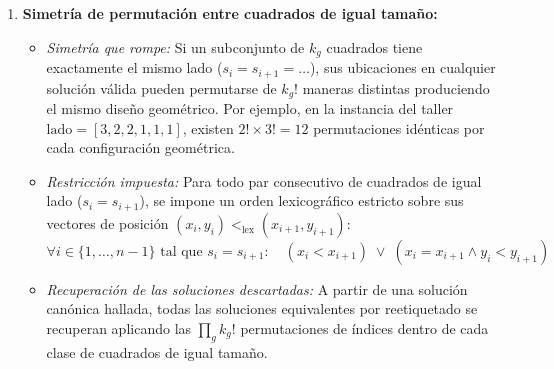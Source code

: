 \begin{enumerate}
    \item \textbf{Simetría de permutación entre cuadrados de igual tamaño:}
    \begin{itemize}
        \item \textit{Simetría que rompe:} Si un subconjunto de $k_g$ cuadrados tiene exactamente el mismo lado ($s_i = s_{i+1} = \dots$), sus ubicaciones en cualquier solución válida pueden permutarse de $k_g!$ maneras distintas produciendo el mismo diseño geométrico. Por ejemplo, en la instancia del taller $\text{lado} = [3, 2, 2, 1, 1, 1]$, existen $2! \times 3! = 12$ permutaciones idénticas por cada configuración geométrica.
        \item \textit{Restricción impuesta:} Para todo par consecutivo de cuadrados de igual lado ($s_i = s_{i+1}$), se impone un orden lexicográfico estricto sobre sus vectores de posición $(x_i, y_i) <_{\text{lex}} (x_{i+1}, y_{i+1})$:
        \[
            \forall i \in \{1, \dots, n-1\} \text{ tal que } s_i = s_{i+1}: \quad
            (x_i < x_{i+1}) \;\lor\; (x_i = x_{i+1} \land y_i < y_{i+1})
        \]
        \item \textit{Recuperación de las soluciones descartadas:} A partir de una solución canónica hallada, todas las soluciones equivalentes por reetiquetado se recuperan aplicando las $\prod_g k_g!$ permutaciones de índices dentro de cada clase de cuadrados de igual tamaño.
    \end{itemize}


\end{enumerate}

